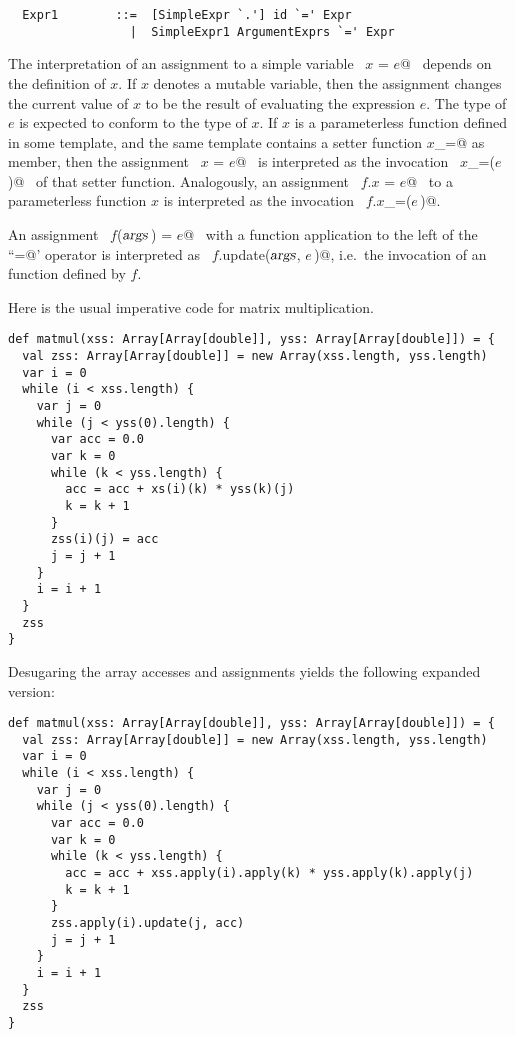\syntax\begin{lstlisting}
  Expr1        ::=  [SimpleExpr `.'] id `=' Expr
                 |  SimpleExpr1 ArgumentExprs `=' Expr
\end{lstlisting}

The interpretation of an assignment to a simple variable ~\lstinline@$x$ = $e$@~
depends on the definition of $x$. If $x$ denotes a mutable
variable, then the assignment changes the current value of $x$ to be
the result of evaluating the expression $e$. The type of $e$ is
expected to conform to the type of $x$. If $x$ is a parameterless
function defined in some template, and the same template contains a
setter function \lstinline@$x$_=@ as member, then the assignment
~\lstinline@$x$ = $e$@~ is interpreted as the invocation
~\lstinline@$x$_=($e\,$)@~ of that setter function.  Analogously, an
assignment ~\lstinline@$f.x$ = $e$@~ to a parameterless function $x$
is interpreted as the invocation ~\lstinline@$f.x$_=($e\,$)@.

An assignment ~\lstinline@$f$($\mbox{\sl args}\,$) = $e$@~ with a function application to the
left of the ``\lstinline@=@' operator is interpreted as 
~\lstinline@$f.$update($\mbox{\sl args}$, $e\,$)@, i.e.\
the invocation of an  function defined by $f$.

\example \label{ex:imp-mat-mul}
Here is the usual imperative code for matrix multiplication.

\begin{lstlisting}
def matmul(xss: Array[Array[double]], yss: Array[Array[double]]) = {
  val zss: Array[Array[double]] = new Array(xss.length, yss.length) 
  var i = 0 
  while (i < xss.length) {
    var j = 0 
    while (j < yss(0).length) {
      var acc = 0.0 
      var k = 0 
      while (k < yss.length) {
        acc = acc + xs(i)(k) * yss(k)(j) 
        k = k + 1
      }
      zss(i)(j) = acc 
      j = j + 1
    }
    i = i + 1
  }
  zss
}
\end{lstlisting}
Desugaring the array accesses and assignments yields the following
expanded version:
\begin{lstlisting}
def matmul(xss: Array[Array[double]], yss: Array[Array[double]]) = {
  val zss: Array[Array[double]] = new Array(xss.length, yss.length) 
  var i = 0 
  while (i < xss.length) {
    var j = 0 
    while (j < yss(0).length) {
      var acc = 0.0 
      var k = 0 
      while (k < yss.length) {
        acc = acc + xss.apply(i).apply(k) * yss.apply(k).apply(j) 
        k = k + 1
      }
      zss.apply(i).update(j, acc) 
      j = j + 1
    }
    i = i + 1
  }
  zss
}
\end{lstlisting}

